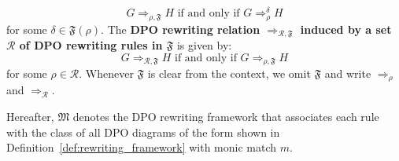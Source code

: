 \begin{definition}
     $$G \mathop{\Rightarrow}_{\rho,\mathfrak{F}} H\text{ if and only if }G \mathop{\Rightarrow}_\rho^\delta H$$
    for some $\delta \mathop{\in} \mathfrak{F}(\rho)$. 
     The \textbf{DPO rewriting relation $\mathop{\Rightarrow}_{\mathcal{R},\mathfrak{F}}$ induced by a set $\mathcal{R}$ of DPO rewriting rules in $\mathfrak{F}$} is given by: 
     $$G \mathop{\Rightarrow}_{\mathcal{R},\mathfrak{F}} H\text{ if and only if }G \mathop{\Rightarrow}_{\rho,\mathfrak{F}} H$$ for some $\rho \mathop{\in} \mathcal{R}$. Whenever $\mathfrak{F}$ is clear from the context, we 
    omit $\mathfrak{F}$ and 
    write $\mathop{\Rightarrow}_{\rho}$ and $\mathop{\Rightarrow}_{\mathcal{R}}$.
  \end{definition}
Hereafter, \(\mathfrak{M}\) denotes the DPO rewriting framework that associates each rule with the class of all DPO diagrams of the form shown in Definition~\ref{def:rewriting_framework} with monic match $m$.
